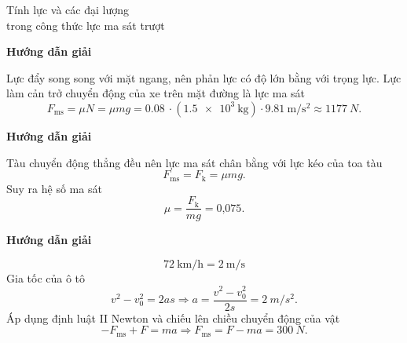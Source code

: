 \begin{dang}{Tính lực và các đại lượng\\ trong công thức lực ma sát trượt}
	{	\begin{center}
			\textbf{Hướng dẫn giải}
		\end{center}
		
		Lực đẩy song song với mặt ngang, nên phản lực có độ lớn bằng với trọng lực. Lực làm cản trở chuyển động của xe trên mặt đường là lực ma sát
		\begin{equation*}
			F_{\text{ms}} =\mu N = \mu  mg =\SI{0.08}{}\cdot(\SI{1.5e3}{\kilogram})\cdot\SI{9.81}{\meter/\second^{2}}\approx \SI{1177}{N}.
		\end{equation*}
	
		
	}
	{	\begin{center}
			\textbf{Hướng dẫn giải}
		\end{center}
		
		Tàu chuyển động thẳng đều nên lực ma sát chân bằng với lực kéo của toa tàu
			\begin{equation*}
				F_{\text{ms}} = F_{\text{k}} = \mu mg.
			\end{equation*}
		Suy ra hệ số ma sát
			\begin{equation*}
				\mu = \dfrac{F_{\text{k}}}{mg} = \text{0,075}.
			\end{equation*} 
	}
	{	\begin{center}
			\textbf{Hướng dẫn giải}
		\end{center}
		$$\SI{72}{\kilo\meter/\hour}=\SI{2}{\meter/\second}$$
		Gia tốc của ô tô 
			\begin{equation*}
				v^2-v^2_0 = 2as \Rightarrow a = \dfrac{v^2-v^2_0}{2s} = \SI{2}{m/s^2}.
			\end{equation*}
			Áp dụng định luật II Newton và chiếu lên chiều chuyển động của vật
			\begin{equation*}
				-F_{\text{ms}}+F = ma \Rightarrow F_{\text{ms}} = F-ma = \SI{300}{N}.
			\end{equation*}

	}
\end{dang}
